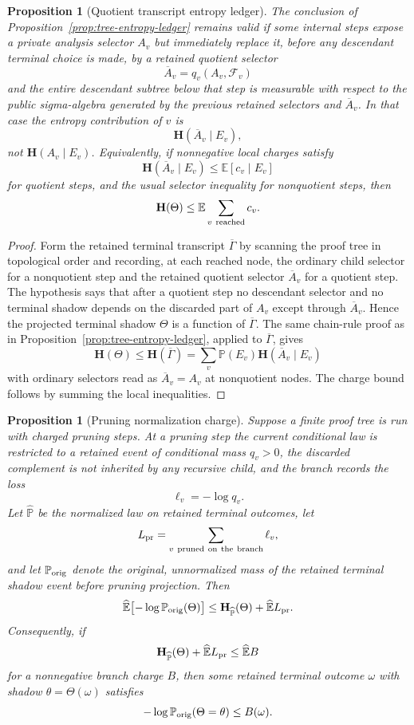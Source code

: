 \documentclass[11pt]{article}
\newtheorem{proposition}[theorem]{Proposition}
\newcommand{\Prb}{\mathbb P}
\newcommand{\EE}{\mathbb E}
\newcommand{\bfH}{\mathbf H}
\begin{document}
\begin{proposition}[Quotient transcript entropy ledger]
\label{prop:quotient-tree-entropy-ledger}
The conclusion of Proposition~\ref{prop:tree-entropy-ledger} remains valid if
some internal steps expose a private analysis selector $A_v$ but immediately
replace it, before any descendant terminal choice is made, by a retained
quotient selector
\[
  \overline A_v=q_v(A_v,\mathcal F_v)
\]
and the entire descendant subtree below that step is measurable with respect to
the public sigma-algebra generated by the previous retained selectors and
$\overline A_v$.  In that case the entropy contribution of $v$ is
\[
  \bfH(\overline A_v\mid E_v),
\]
not $\bfH(A_v\mid E_v)$.  Equivalently, if nonnegative local charges satisfy
\[
  \bfH(\overline A_v\mid E_v)\le \EE[c_v\mid E_v]
\]
for quotient steps, and the usual selector inequality for nonquotient steps,
then
\[
  \bfH(\Theta)\le \EE\sum_{v\ {\rm reached}}c_v .
\]
\end{proposition}

\begin{proof}
Form the retained terminal transcript $\overline\Gamma$ by scanning the proof
tree in topological order and recording, at each reached node, the ordinary
child selector for a nonquotient step and the retained quotient selector
$\overline A_v$ for a quotient step.  The hypothesis says that after a quotient
step no descendant selector and no terminal shadow depends on the discarded
part of $A_v$ except through $\overline A_v$.  Hence the projected terminal
shadow $\Theta$ is a function of $\overline\Gamma$.  The same chain-rule proof
as in Proposition~\ref{prop:tree-entropy-ledger}, applied to
$\overline\Gamma$, gives
\[
  \bfH(\Theta)\le \bfH(\overline\Gamma)
  =
  \sum_v \Prb(E_v)\bfH(\overline A_v\mid E_v)
\]
with ordinary selectors read as $\overline A_v=A_v$ at nonquotient nodes.
The charge bound follows by summing the local inequalities.
\end{proof}

\begin{proposition}[Pruning normalization charge]
\label{prop:pruning-normalization}
Suppose a finite proof tree is run with charged pruning steps.  At a pruning
step the current conditional law is restricted to a retained event of conditional
mass $q_v>0$, the discarded complement is not inherited by any recursive child,
and the branch records the loss
\[
  \ell_v=-\log q_v .
\]
Let $\widehat{\Prb}$ be the normalized law on retained terminal outcomes, let
\[
  L_{\rm pr}=\sum_{v\ {\rm pruned\ on\ the\ branch}}\ell_v,
\]
and let $\Prb_{\rm orig}$ denote the original, unnormalized mass of the retained
terminal shadow event before pruning projection.  Then
\[
  \widehat{\EE}\bigl[-\log \Prb_{\rm orig}(\Theta)\bigr]
  \le
  \bfH_{\widehat{\Prb}}(\Theta)+\widehat{\EE}L_{\rm pr}.
\]
Consequently, if
\[
  \bfH_{\widehat{\Prb}}(\Theta)+\widehat{\EE}L_{\rm pr}
  \le
  \widehat{\EE} B
\]
for a nonnegative branch charge $B$, then some retained terminal outcome
$\omega$ with shadow $\theta=\Theta(\omega)$ satisfies
\[
  -\log \Prb_{\rm orig}(\Theta=\theta)\le B(\omega).
\]
\end{proposition}
\end{document}
